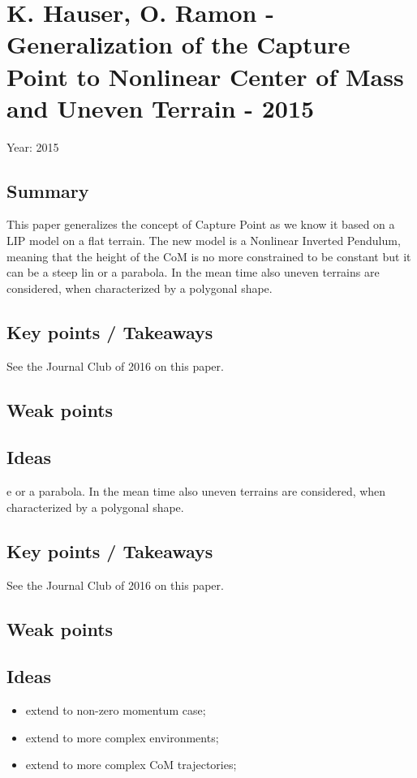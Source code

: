 \section{K. Hauser, O. Ramon - Generalization of the Capture Point to Nonlinear Center of Mass and Uneven Terrain \cite{RamonHauser2015} - 2015}
Year: 2015
\subsection*{Summary}
This paper generalizes the concept of Capture Point as we know it based on a LIP model on a flat terrain. The new model is a Nonlinear Inverted Pendulum, meaning that the height of the CoM is no more constrained to be constant but it can be a steep lin or a parabola. In the mean time also uneven terrains are considered, when characterized by a polygonal shape.
\subsection*{Key points / Takeaways}
See the Journal Club of 2016 on this paper.
\subsection*{Weak points}
\subsection*{Ideas}e or a parabola. In the mean time also uneven terrains are considered, when characterized by a polygonal shape.
\subsection*{Key points / Takeaways}
See the Journal Club of 2016 on this paper.
\subsection*{Weak points}
\subsection*{Ideas}
\begin{itemize}
\item extend to non-zero momentum case;
\item extend to more complex environments;
\item extend to more complex CoM trajectories;
\end{itemize}
